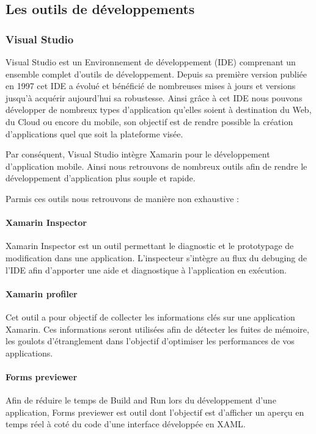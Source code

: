 \documentclass[11]{article}
\begin{document}
\subsection{Les outils de développements}

\subsubsection{Visual Studio}

Visual Studio est un Environnement de développement (IDE) comprenant un ensemble complet d’outils de développement. Depuis sa première version publiée en 1997 cet IDE a évolué et bénéficié de nombreuses mises à jours et versions jusqu’à acquérir aujourd’hui sa robustesse. Ainsi grâce à cet IDE nous pouvons développer de nombreux types d’application qu’elles soient à destination du Web, du Cloud ou encore du mobile, son objectif est de rendre possible la création d’applications quel que soit la plateforme visée.
  
\vspace{0.5cm}
    
Par conséquent, Visual Studio intègre Xamarin pour le développement d’application mobile. Ainsi nous retrouvons de nombreux outils afin de rendre le développement d’application plus souple et rapide.
   
\vspace{0.5cm}
   
Parmis ces outils nous retrouvons de manière non exhaustive :
   
  
\paragraph{Xamarin Inspector} 
Xamarin Inspector est un outil permettant le diagnostic et le prototypage de modification dans une application. L’inspecteur s’intègre au flux du debuging de l’IDE afin d’apporter une aide et diagnostique à l’application en exécution.

\paragraph{Xamarin profiler}
Cet outil a pour objectif de collecter les informations clés sur une application Xamarin. Ces informations seront utilisées afin de détecter les fuites de mémoire, les goulots d’étranglement dans l’objectif d’optimiser les performances de vos applications.

\paragraph{Forms previewer}
Afin de réduire le temps de Build and Run lors du développement d’une application, Forms previewer est outil dont l’objectif est d’afficher un aperçu en temps réel à coté du code d’une interface développée en XAML.
\end{document}
